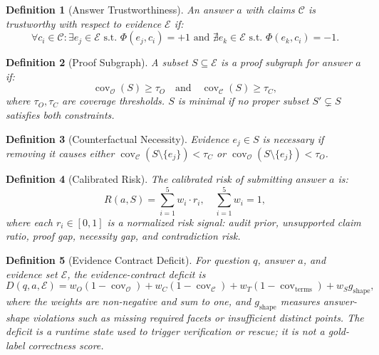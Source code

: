 \documentclass[journal,onecolumn,11pt]{IEEEtran}
\newtheorem{definition}{Definition}
\begin{document}
\begin{definition}[Answer Trustworthiness]
An answer $a$ with claims $\mathcal{C}$ is \textit{trustworthy} with respect to evidence $\mathcal{E}$ if:
\begin{equation}
\forall c_i \in \mathcal{C}: \exists e_j \in \mathcal{E} \text{ s.t. } \Phi(e_j, c_i) = +1 \text{ and } \nexists e_k \in \mathcal{E} \text{ s.t. } \Phi(e_k, c_i) = -1.
\end{equation}
\end{definition}

\begin{definition}[Proof Subgraph]
A subset $S \subseteq \mathcal{E}$ is a \textit{proof subgraph} for answer $a$ if:
\begin{equation}
\operatorname{cov}_{\mathcal{O}}(S) \geq \tau_O \quad \text{and} \quad \operatorname{cov}_{\mathcal{C}}(S) \geq \tau_C,
\end{equation}
where $\tau_O, \tau_C$ are coverage thresholds. $S$ is \textit{minimal} if no proper subset $S' \subsetneq S$ satisfies both constraints.
\end{definition}

\begin{definition}[Counterfactual Necessity]
Evidence $e_j \in S$ is \textit{necessary} if removing it causes either $\operatorname{cov}_{\mathcal{C}}(S \setminus \{e_j\}) < \tau_C$ or $\operatorname{cov}_{\mathcal{O}}(S \setminus \{e_j\}) < \tau_O$.
\end{definition}

\begin{definition}[Calibrated Risk]
\label{def:risk}
The calibrated risk of submitting answer $a$ is:
\begin{equation}
R(a, S) = \sum_{i=1}^{5} w_i \cdot r_i, \quad \sum_{i=1}^{5} w_i = 1,
\end{equation}
where each $r_i \in [0,1]$ is a normalized risk signal: audit prior, unsupported claim ratio, proof gap, necessity gap, and contradiction risk.
\end{definition}

\begin{definition}[Evidence Contract Deficit]
For question $q$, answer $a$, and evidence set $\mathcal{E}$, the evidence-contract deficit is
\begin{equation}
D(q,a,\mathcal{E}) = w_O(1-\operatorname{cov}_{\mathcal{O}}) + w_C(1-\operatorname{cov}_{\mathcal{C}}) + w_T(1-\operatorname{cov}_{\text{terms}}) + w_S g_{\text{shape}},
\end{equation}
where the weights are non-negative and sum to one, and $g_{\text{shape}}$ measures answer-shape violations such as missing required facets or insufficient distinct points. The deficit is a runtime state used to trigger verification or rescue; it is not a gold-label correctness score.
\end{definition}
\end{document}
